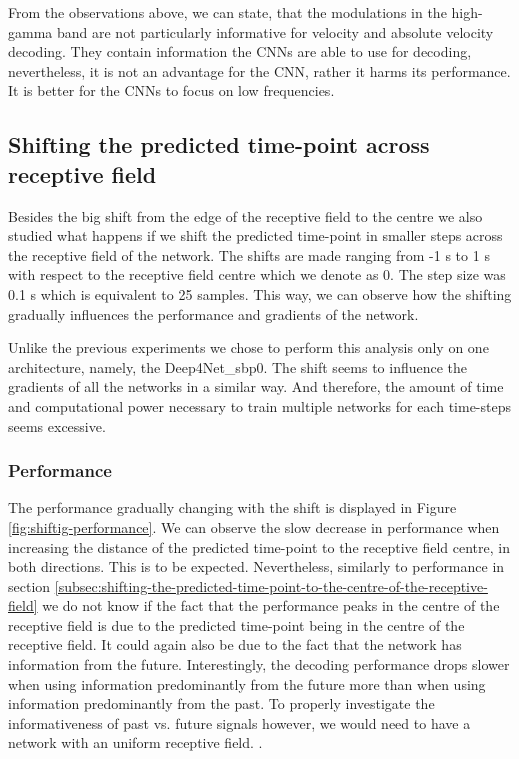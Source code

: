 From the observations above, we can state, that the modulations in the high-gamma band are not particularly informative for velocity and absolute velocity decoding.
They contain information the CNNs are able to use for decoding, nevertheless, it is not an advantage for the CNN, rather it harms its performance.
It is better for the CNNs to focus on low frequencies.


\subsection{Shifting the predicted time-point across receptive field}\label{subsec:shifting-the-predicted-time-point-across-receptive-field}
Besides the big shift from the edge of the receptive field to the centre we also studied what happens if we shift the predicted time-point in smaller steps across the receptive field of the network. 
The shifts are made ranging from  -1 s  to 1 s with respect to the receptive field centre which we denote as 0.
The step size was 0.1 s which is equivalent to 25 samples.
This way, we can observe how the shifting gradually influences the performance and gradients of the network. 

Unlike the previous experiments we chose to perform this analysis only on one architecture, namely, the Deep4Net\_sbp0. 
The shift seems to influence the gradients of all the networks in a similar way. 
And therefore, the amount of time and computational power necessary to train multiple networks for each time-steps seems excessive.  

\subsubsection{Performance}\label{subsubsec:across-shiftig-performace}
The performance gradually changing with the shift is displayed in Figure \ref{fig:shiftig-performance}.
We can observe the slow decrease in performance when increasing the distance of the predicted time-point to the receptive field centre, in both directions. 
This is to be expected. 
Nevertheless, similarly to performance in section \ref{subsec:shifting-the-predicted-time-point-to-the-centre-of-the-receptive-field} we do not know if the fact that the performance peaks in the centre of the receptive field is due to the predicted time-point being in the centre of the receptive field. 
It could again also be due to the fact that the network has information from the future. 
Interestingly, the decoding performance drops slower when using information predominantly from the future more than when using information predominantly from the past.
To properly investigate the informativeness of past vs. future signals however, we would need to have a network with an uniform receptive field. 
.

